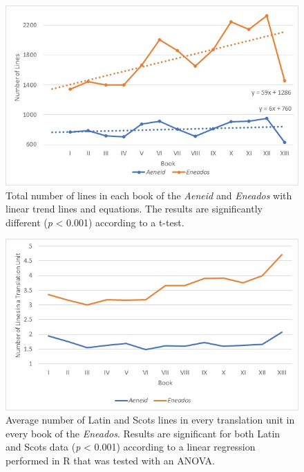 \documentclass{dhbenelux}
\begin{document}
\begin{figure}[H]
\begin{center}
\includegraphics[width=1\linewidth]{Images/Figure3.jpg}
\end{center}
\caption{Total number of lines in each book of the \emph{Aeneid} and \emph{Eneados} with linear trend lines and equations.  The results are significantly different (\emph{p} < 0.001) according to a t-test.}
\label{fig:figure3}
\end{figure}

\pagebreak
\begin{figure}[H]
\begin{center}
\includegraphics[width=1\linewidth]{Images/Figure4.jpg}
\end{center}
\caption{Average number of Latin and Scots lines in every translation unit in every book of the \emph{Eneados}.  Results are significant for both Latin and Scots data (\emph{p} < 0.001) according to a linear regression performed in R that was tested with an ANOVA.}
\label{fig:figure4}
\end{figure}
\end{document}
